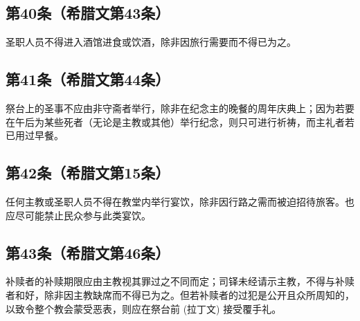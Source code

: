 \subsection{第40条（希腊文第43条）}

\par

圣职人员不得进入酒馆进食或饮酒，除非因旅行需要而不得已为之。\par


\subsection{第41条（希腊文第44条）}

\par

祭台上的圣事不应由非守斋者举行，除非在纪念主的晚餐的周年庆典上；因为若要在午后为某些死者（无论是主教或其他）举行纪念，则只可进行祈祷，而主礼者若已用过早餐。\par


\subsection{第42条（希腊文第15条）}

\par

任何主教或圣职人员不得在教堂内举行宴饮，除非因行路之需而被迫招待旅客。也应尽可能禁止民众参与此类宴饮。\par


\subsection{第43条（希腊文第46条）}

\par

补赎者的补赎期限应由主教视其罪过之不同而定；司铎未经请示主教，不得与补赎者和好，除非因主教缺席而不得已为之。但若补赎者的过犯是公开且众所周知的，以致令整个教会蒙受恶表，则应在祭台前 (拉丁文) 接受覆手礼。\par

